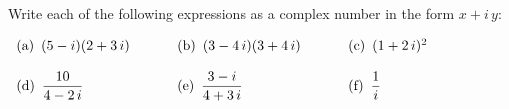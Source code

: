 Write each of the following expressions as a complex number in the form $x+i\,y$:

$
\begin{array}[h!]{lll}
{\rm (a)}\hskip5pt (5-i)(2+3\,i)\hskip24pt&
{\rm (b)}\hskip5pt (3-4\,i)(3+4\,i)\hskip24pt&
{\rm (c)}\hskip5pt (1+2\,i)^2\\
\noalign{\vskip12pt}
{\rm (d)}\hskip5pt \displaystyle{10\over4-2\,i}&
{\rm (e)}\hskip5pt \displaystyle{3-i\over4+3\,i}&
{\rm (f)}\hskip5pt \displaystyle{1\over i}
\end{array}
$